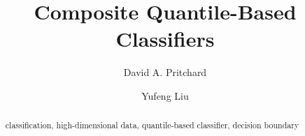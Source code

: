 \documentclass{article}
\begin{document}
\title{Composite Quantile-Based Classifiers}
\author[1]{David A. Pritchard}
\author[2]{Yufeng Liu}
\date{}
\maketitle

\begin{abstract}
  
\end{abstract}

\renewcommand{\abstractname}{Keywords}
\begin{abstract}
  \noindent
  classification, high-dimensional data, quantile-based classifier, decision
  boundary
\end{abstract}















\end{document}
